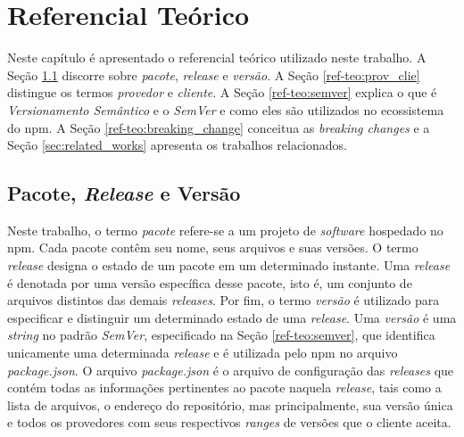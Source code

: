 \chapter{Referencial Teórico}
\label{cap:ref-teorico}
Neste capítulo é apresentado o referencial teórico utilizado neste trabalho. A Seção \ref{ref-teo:pac_rel_ver} discorre sobre \textit{pacote}, \textit{release} e \textit{versão}. A Seção \ref{ref-teo:prov_clie} distingue os termos \textit{provedor} e \textit{cliente}. A Seção \ref{ref-teo:semver} explica o que é \textit{Versionamento Semântico} e o \textit{SemVer} e como eles são utilizados no ecossistema do \gls{npm}. A Seção \ref{ref-teo:breaking_change} conceitua as \textit{breaking changes} e a Seção \ref{sec:related_works} apresenta os trabalhos relacionados.

\section{Pacote, \textit{Release} e Versão}
\label{ref-teo:pac_rel_ver}
Neste trabalho, o termo \textit{pacote} refere-se a um projeto de \textit{software} hospedado no \gls{npm}. Cada pacote contêm seu nome, seus arquivos e suas versões. O termo \textit{release} designa o estado de um pacote em um determinado instante. Uma \textit{release} é denotada por uma versão específica desse pacote, isto é, um conjunto de arquivos distintos das demais \textit{releases}. Por fim, o termo \textit{versão} é utilizado para especificar e distinguir um determinado estado de uma \textit{release}. Uma \textit{versão} é uma \textit{string} no padrão \textit{SemVer}, especificado na Seção \ref{ref-teo:semver}, que identifica unicamente uma determinada \textit{release} e é utilizada pelo \gls{npm} no arquivo \textit{package.json}. O arquivo \textit{package.json} é o arquivo de configuração das \textit{releases} que contém todas as informações pertinentes ao pacote naquela \textit{release}, tais como a lista de arquivos, o endereço do repositório, mas principalmente, sua versão única e todos os provedores com seus respectivos \textit{ranges} de versões que o cliente aceita.


